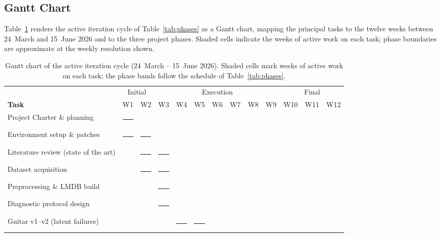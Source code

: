 \documentclass[a4paper,11pt,oneside,openany]{book}
\begin{document}
\begin{appendices}
\section{Gantt Chart}\label{sec:gantt}

Table~\ref{tab:gantt} renders the active iteration cycle of Table~\ref{tab:phases} as a Gantt chart, mapping the principal tasks to the twelve weeks between 24~March and 15~June 2026 and to the three project phases. Shaded cells indicate the weeks of active work on each task; phase boundaries are approximate at the weekly resolution shown.

\begin{table}[H]
\centering
\caption{Gantt chart of the active iteration cycle (24~March -- 15~June 2026). Shaded cells mark weeks of active work on each task; the phase bands follow the schedule of Table~\ref{tab:phases}.}
\label{tab:gantt}
\footnotesize
\setlength{\tabcolsep}{1.5pt}
\renewcommand{\arraystretch}{1.25}
\newcommand{\gb}{{\color{blue!55}\rule{4.6mm}{2.6mm}}}
\begin{tabular}{@{}p{4.7cm}*{12}{c}@{}}
\toprule
 & \multicolumn{2}{c}{Initial} & \multicolumn{7}{c}{Execution} & \multicolumn{3}{c}{Final} \\
\cmidrule(lr){2-3}\cmidrule(lr){4-10}\cmidrule(lr){11-13}
\textbf{Task} & {\tiny W1} & {\tiny W2} & {\tiny W3} & {\tiny W4} & {\tiny W5} & {\tiny W6} & {\tiny W7} & {\tiny W8} & {\tiny W9} & {\tiny W10} & {\tiny W11} & {\tiny W12} \\
\midrule
Project Charter \& planning           & \gb &     &     &     &     &     &     &     &     &     &     &     \\
Environment setup \& patches          & \gb & \gb &     &     &     &     &     &     &     &     &     &     \\
Literature review (state of the art)  &     & \gb & \gb &     &     &     &     &     &     &     &     &     \\
Dataset acquisition                   &     & \gb & \gb &     &     &     &     &     &     &     &     &     \\
Preprocessing \& LMDB build           &     &     & \gb &     &     &     &     &     &     &     &     &     \\
Diagnostic protocol design            &     &     & \gb &     &     &     &     &     &     &     &     &     \\
Guitar v1--v2 (latent failures)       &     &     &     & \gb & \gb &     &     &     &     &     &     &     \\

\end{tabular}
\end{table}
\end{appendices}
\end{document}
